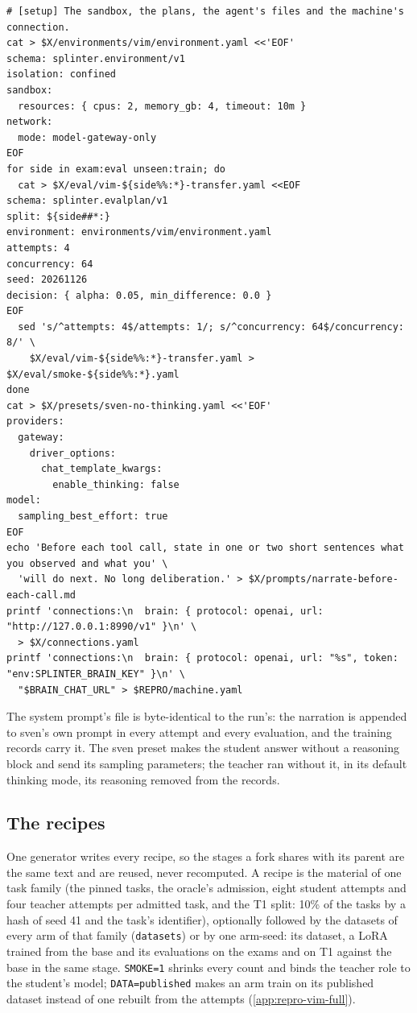 {\scriptsize
\begin{verbatim}
# [setup] The sandbox, the plans, the agent's files and the machine's connection.
cat > $X/environments/vim/environment.yaml <<'EOF'
schema: splinter.environment/v1
isolation: confined
sandbox:
  resources: { cpus: 2, memory_gb: 4, timeout: 10m }
network:
  mode: model-gateway-only
EOF
for side in exam:eval unseen:train; do
  cat > $X/eval/vim-${side%%:*}-transfer.yaml <<EOF
schema: splinter.evalplan/v1
split: ${side##*:}
environment: environments/vim/environment.yaml
attempts: 4
concurrency: 64
seed: 20261126
decision: { alpha: 0.05, min_difference: 0.0 }
EOF
  sed 's/^attempts: 4$/attempts: 1/; s/^concurrency: 64$/concurrency: 8/' \
    $X/eval/vim-${side%%:*}-transfer.yaml > $X/eval/smoke-${side%%:*}.yaml
done
cat > $X/presets/sven-no-thinking.yaml <<'EOF'
providers:
  gateway:
    driver_options:
      chat_template_kwargs:
        enable_thinking: false
model:
  sampling_best_effort: true
EOF
echo 'Before each tool call, state in one or two short sentences what you observed and what you' \
  'will do next. No long deliberation.' > $X/prompts/narrate-before-each-call.md
printf 'connections:\n  brain: { protocol: openai, url: "http://127.0.0.1:8990/v1" }\n' \
  > $X/connections.yaml
printf 'connections:\n  brain: { protocol: openai, url: "%s", token: "env:SPLINTER_BRAIN_KEY" }\n' \
  "$BRAIN_CHAT_URL" > $REPRO/machine.yaml
\end{verbatim}
}

\begin{sloppypar}
The system prompt's file is byte-identical to the run's: the narration is appended to sven's own prompt in every attempt
and every evaluation, and the training records carry it. The sven preset makes the student answer without a reasoning block
and send its sampling parameters; the teacher ran without it, in its default thinking mode, its reasoning removed from the
records.
\end{sloppypar}

\subsection{The recipes}\label{app:repro-vim-recipes}

\begin{sloppypar}
One generator writes every recipe, so the stages a fork shares with its parent are the same text and are reused, never
recomputed. A recipe is the material of one task family (the pinned tasks, the oracle's admission, eight student attempts and
four teacher attempts per admitted task, and the T1 split: 10\% of the tasks by a hash of seed 41 and the task's identifier),
optionally followed by the datasets of every arm of that family (\texttt{datasets}) or by one arm-seed: its dataset, a LoRA
trained from the base and its evaluations on the exams and on T1 against the base in the same stage.
\texttt{SMOKE=1} shrinks every count and binds the teacher role to the student's model; \texttt{DATA=published} makes an
arm train on its published dataset instead of one rebuilt from the attempts (\cref{app:repro-vim-full}).
\end{sloppypar}

